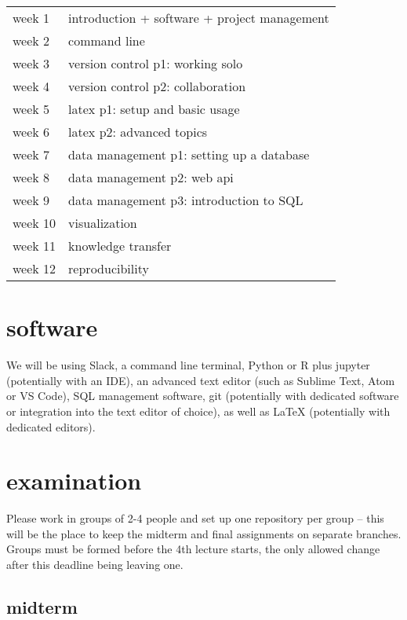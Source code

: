 \documentclass[12pt]{article}
\begin{document}
\begin{tabularx}{0.7\textwidth}{Xl}
    week 1 & introduction + software + project management \\
    week 2 & command line \\
    week 3 & version control p1: working solo \\
    week 4 & version control p2: collaboration \\
    week 5 & latex p1: setup and basic usage \\
    week 6 & latex p2: advanced topics \\
    week 7 & data management p1: setting up a database \\
    week 8 & data management p2: web api \\
    week 9 & data management p3: introduction to SQL \\
    week 10 & visualization \\
    week 11 & knowledge transfer \\
    week 12 & reproducibility \\
\end{tabularx}


\section{software} %
\label{sec:software}
We will be using Slack, a command line terminal, Python or R plus jupyter (potentially with an IDE), an advanced text editor (such as Sublime Text, Atom or VS Code), SQL management software, git (potentially with dedicated software or integration into the text editor of choice), as well as LaTeX (potentially with dedicated editors).


\section{examination} %
\label{sec:examination}

Please work in groups of 2-4 people and set up one repository per group -- this will be the place to keep the midterm and final assignments on separate branches. Groups must be formed before the 4th lecture starts, the only allowed change after this deadline being leaving one.

\subsection{midterm} %
\end{document}
